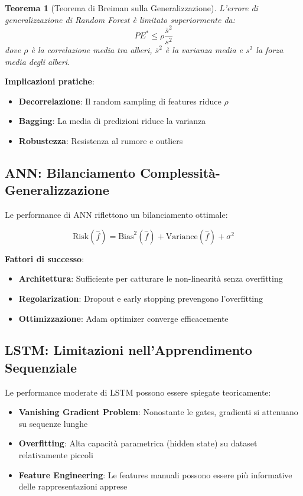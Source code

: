 \documentclass[12pt,a4paper,twoside]{report}
\newtheorem{theorem}{Teorema}[section]
\begin{document}
\begin{appendices}
\begin{theorem}[Teorema di Breiman sulla Generalizzazione]
L'errore di generalizzazione di Random Forest è limitato superiormente da:
$$PE^* \leq \rho \frac{\bar{s}^2}{s^2}$$
dove $\rho$ è la correlazione media tra alberi, $\bar{s}^2$ è la varianza media e $s^2$ la forza media degli alberi.
\end{theorem}

\textbf{Implicazioni pratiche}:
\begin{itemize}
    \item \textbf{Decorrelazione}: Il random sampling di features riduce $\rho$
    \item \textbf{Bagging}: La media di predizioni riduce la varianza
    \item \textbf{Robustezza}: Resistenza al rumore e outliers
\end{itemize}

\subsection{ANN: Bilanciamento Complessità-Generalizzazione}

Le performance di ANN riflettono un bilanciamento ottimale:

\begin{equation}
\text{Risk}(\hat{f}) = \text{Bias}^2(\hat{f}) + \text{Variance}(\hat{f}) + \sigma^2
\end{equation}

\textbf{Fattori di successo}:
\begin{itemize}
    \item \textbf{Architettura}: Sufficiente per catturare le non-linearità senza overfitting
    \item \textbf{Regolarization}: Dropout e early stopping prevengono l'overfitting
    \item \textbf{Ottimizzazione}: Adam optimizer converge efficacemente
\end{itemize}

\subsection{LSTM: Limitazioni nell'Apprendimento Sequenziale}

Le performance moderate di LSTM possono essere spiegate teoricamente:

\begin{itemize}
    \item \textbf{Vanishing Gradient Problem}: Nonostante le gates, gradienti si attenuano su sequenze lunghe
    \item \textbf{Overfitting}: Alta capacità parametrica (hidden state) su dataset relativamente piccoli
    \item \textbf{Feature Engineering}: Le features manuali possono essere più informative delle rappresentazioni apprese
\end{itemize}


\end{appendices}
\end{document}
